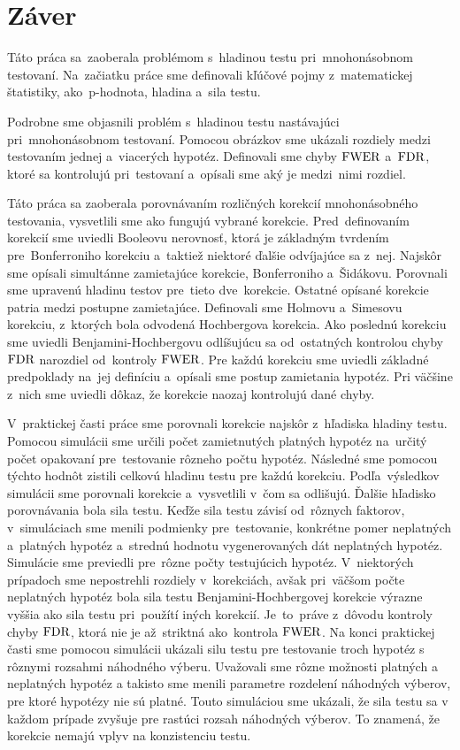 \chapter*{Záver}

Táto práca sa~zaoberala problémom s~hladinou testu pri~mnohonásobnom testovaní. 
Na~začiatku práce sme definovali kľúčové pojmy z~matematickej štatistiky, 
ako~p-hodnota, hladina a~sila testu. 

Podrobne sme objasnili problém s~hladinou testu nastávajúci pri~mnohonásobnom testovaní. 
Pomocou obrázkov sme ukázali rozdiely medzi testovaním jednej a~viacerých hypotéz. 
Definovali sme chyby ${\rm FWER}$ a~${\rm FDR}$, ktoré sa kontrolujú pri~testovaní 
a~opísali sme aký je medzi~nimi rozdiel. 

Táto práca sa zaoberala porovnávaním rozličných korekcií mnohonásobného testovania, 
vysvetlili sme ako fungujú vybrané korekcie. 
Pred~definovaním korekcií sme uviedli Booleovu nerovnosť, ktorá je základným tvrdením 
pre~Bonferroniho korekciu a~taktiež niektoré ďalšie odvíjajúce sa z~nej. 
Najskôr sme opísali simultánne zamietajúce korekcie, Bonferroniho a~Šidákovu. 
Porovnali sme upravenú hladinu testov pre~tieto dve~korekcie. 
Ostatné opísané korekcie patria medzi postupne zamietajúce. 
Definovali sme Holmovu a~Simesovu korekciu, z~ktorých bola odvodená Hochbergova korekcia. 
Ako poslednú korekciu sme uviedli Benjamini-Hochbergovu odlíšujúcu sa od~ostatných 
kontrolou chyby ${\rm FDR}$ narozdiel od~kontroly ${\rm FWER}$. 
Pre každú korekciu sme uviedli základné predpoklady na~jej definíciu 
a~opísali sme postup zamietania hypotéz. 
Pri väčšine z~nich sme uviedli dôkaz, že korekcie naozaj kontrolujú dané chyby. 

V~praktickej časti práce sme porovnali korekcie najskôr z~hľadiska hladiny testu. 
Pomocou simulácii sme určili počet zamietnutých platných hypotéz na~určitý počet opakovaní 
pre~testovanie rôzneho počtu hypotéz. 
Následné sme pomocou týchto hodnôt zistili celkovú hladinu testu pre každú korekciu.
Podľa~výsledkov simulácii sme porovnali korekcie a~vysvetlili v~čom sa odlišujú. 
Ďalšie hľadisko porovnávania bola sila testu. 
Keďže sila testu závisí od~rôznych faktorov, v~simuláciach sme menili podmienky pre~testovanie, 
konkrétne pomer neplatných a~platných hypotéz a~strednú hodnotu vygenerovaných dát neplatných hypotéz. 
Simulácie sme previedli pre~rôzne počty testujúcich hypotéz. 
V~niektorých prípadoch sme nepostrehli rozdiely v~korekciách, 
avšak pri~väčšom počte neplatných hypotéz bola sila testu Benjamini-Hochbergovej korekcie výrazne vyššia 
ako sila testu pri~použítí iných korekcií. 
Je~to~práve z~dôvodu kontroly chyby ${\rm FDR}$, ktorá nie je až~striktná ako~kontrola ${\rm FWER}$. 
Na konci praktickej časti sme pomocou simulácii ukázali silu testu pre testovanie troch hypotéz 
s rôznymi rozsahmi náhodného výberu. 
Uvažovali sme rôzne možnosti platných a neplatných hypotéz a takisto sme menili parametre rozdelení náhodných výberov, 
pre ktoré hypotézy nie sú platné. 
Touto simuláciou sme ukázali, že sila testu sa v každom prípade zvyšuje pre rastúci rozsah náhodných výberov. 
To znamená, že korekcie nemajú vplyv na konzistenciu testu. 
 